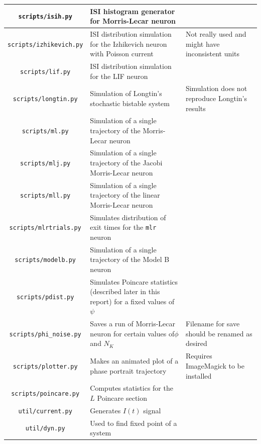 \documentclass[letterpaper,12pt]{article}
\numberwithin{table}{section}
\numberwithin{figure}{section}
\numberwithin{equation}{section}
\begin{document}
\begin{flushleft}
\begin{center}
\begin{tabularx}{\linewidth}{ | c | Y | X | }
            \hline
            \texttt{scripts/isih.py} & ISI histogram generator for Morris-Lecar neuron & \\
            \hline
            \texttt{scripts/izhikevich.py} & ISI distribution simulation for the Izhikevich neuron with Poisson current & Not really used and might have inconsistent units \\
            \hline
            \texttt{scripts/lif.py} & ISI distribution simulation for the LIF neuron & \\
            \hline
            \texttt{scripts/longtin.py} & Simulation of Longtin's stochastic bistable system & Simulation does not reproduce Longtin's results \\
            \hline
            \texttt{scripts/ml.py} & Simulation of a single trajectory of the Morris-Lecar neuron & \\
            \hline
            \texttt{scripts/mlj.py} & Simulation of a single trajectory of the Jacobi Morris-Lecar neuron & \\
            \hline
            \texttt{scripts/mll.py} & Simulation of a single trajectory of the linear Morris-Lecar neuron & \\
            \hline
            \texttt{scripts/mlrtrials.py} & Simulates distribution of exit times for the \texttt{mlr} neuron & \\
            \hline
            \texttt{scripts/modelb.py} & Simulation of a single trajectory of the Model B neuron & \\
            \hline
            \texttt{scripts/pdist.py} & Simulates Poincare statistics (described later in this report) for a fixed values of $\psi$ & \\
            \hline
            \texttt{scripts/phi\_noise.py} & Saves a run of Morris-Lecar neuron for certain values of$\phi$ and $N_K$ & Filename for save should be renamed as desired \\
            \hline
            \texttt{scripts/plotter.py} & Makes an animated plot of a phase portrait trajectory & Requires ImageMagick to be installed \\
            \hline
            \texttt{scripts/poincare.py} & Computes statistics for the $L$ Poincare section & \\
            \hline
            \texttt{util/current.py} & Generates $I(t)$ signal & \\
            \hline
            \texttt{util/dyn.py} & Used to find fixed point of a system & \\

\end{tabularx}
\end{center}
\end{flushleft}
\end{document}
